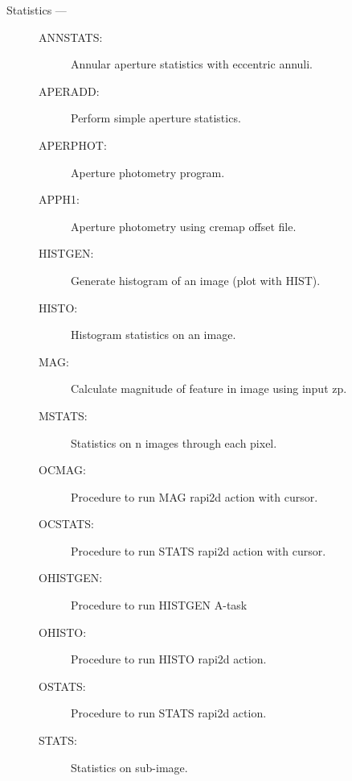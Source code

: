 \begin{description}
\item [Statistics ---]
\begin{description}
\item [ANNSTATS:]  Annular aperture statistics with eccentric annuli.
\item [APERADD:]  Perform simple aperture statistics.
\item [APERPHOT:]  Aperture photometry program.
\item [APPH1:]  Aperture photometry using cremap offset file.
\item [HISTGEN:]  Generate histogram of an image (plot with HIST).
\item [HISTO:]  Histogram statistics on an image.
\item [MAG:]  Calculate magnitude of feature in image using input zp.
\item [MSTATS:]  Statistics on n images through each pixel.
\item [OCMAG:]  Procedure to run MAG rapi2d action with cursor.
\item [OCSTATS:]  Procedure to run STATS rapi2d action with cursor.
\item [OHISTGEN:]  Procedure to run HISTGEN A-task
\item [OHISTO:]  Procedure to run HISTO rapi2d action.
\item [OSTATS:]  Procedure to run STATS rapi2d action.
\item [STATS:]  Statistics on sub-image.
\end{description}


\end{description}

